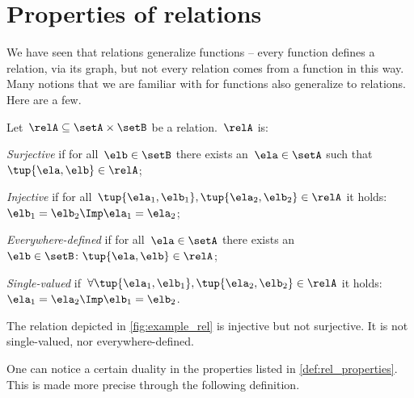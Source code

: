 

\section{Properties of relations}
We have seen that relations generalize functions -- every function defines a relation, via its graph, but not every relation comes from a function in this way. Many notions that we are familiar with for functions also generalize to relations. Here are a few.

\begin{definition}
  \label{def:rel_properties}
  Let~$\relA\subseteq \setA \times \setB$ be a relation.~$\relA$ is:
  \begin{compactenum}
    \item \emph{Surjective} if for all~$\elb\in \setB$ there exists an~$\ela\in \setA$ such that~$\tup{\ela,\elb}\in \relA$;
    \item \emph{Injective} if for all~$ \tup{\ela_1,\elb_1},\tup{\ela_2,\elb_2}\in \relA$ it holds:~$\elb_1=\elb_2 \Imp \ela_1=\ela_2$;
    \item \emph{Everywhere-defined} if for all~$\ela\in \setA$ there exists an ~$\elb \in \setB\colon \tup{\ela,\elb}\in \relA$;
    \item \emph{Single-valued} if~$\forall \tup{\ela_1,\elb_1},\tup{\ela_2,\elb_2}\in \relA$ it holds:~$\ela_1=\ela_2\Imp \elb_1=\elb_2$.
  \end{compactenum}
\end{definition}

\begin{example}
  The relation depicted in \cref{fig:example_rel} is injective but not surjective. It is not single-valued, nor everywhere-defined. \end{example}

One can notice a certain duality in the properties listed in \cref{def:rel_properties}. This is made more precise through the following definition.


